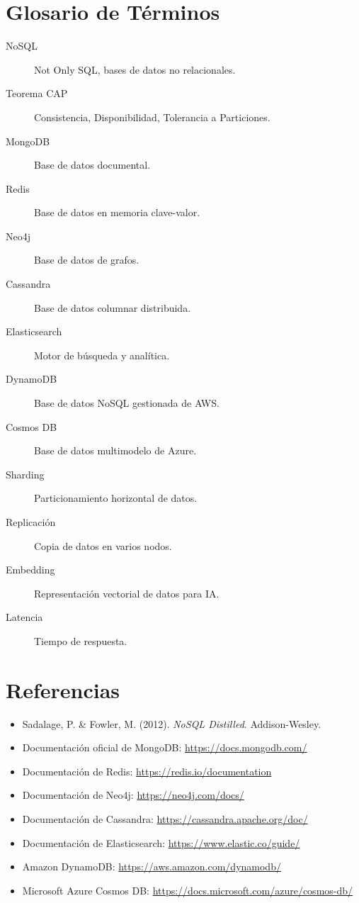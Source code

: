 \documentclass[12pt,a4paper,openany,oneside]{book}
\begin{document}
\chapter{Glosario de Términos}
\begin{description}
    \item[NoSQL] Not Only SQL, bases de datos no relacionales.
    \item[Teorema CAP] Consistencia, Disponibilidad, Tolerancia a Particiones.
    \item[MongoDB] Base de datos documental.
    \item[Redis] Base de datos en memoria clave-valor.
    \item[Neo4j] Base de datos de grafos.
    \item[Cassandra] Base de datos columnar distribuida.
    \item[Elasticsearch] Motor de búsqueda y analítica.
    \item[DynamoDB] Base de datos NoSQL gestionada de AWS.
    \item[Cosmos DB] Base de datos multimodelo de Azure.
    \item[Sharding] Particionamiento horizontal de datos.
    \item[Replicación] Copia de datos en varios nodos.
    \item[Embedding] Representación vectorial de datos para IA.
    \item[Latencia] Tiempo de respuesta.
\end{description}

\chapter*{Referencias}
\begin{itemize}
    \item Sadalage, P. \& Fowler, M. (2012). \textit{NoSQL Distilled}. Addison-Wesley.
    \item Documentación oficial de MongoDB: \url{https://docs.mongodb.com/}
    \item Documentación de Redis: \url{https://redis.io/documentation}
    \item Documentación de Neo4j: \url{https://neo4j.com/docs/}
    \item Documentación de Cassandra: \url{https://cassandra.apache.org/doc/}
    \item Documentación de Elasticsearch: \url{https://www.elastic.co/guide/}
    \item Amazon DynamoDB: \url{https://aws.amazon.com/dynamodb/}
    \item Microsoft Azure Cosmos DB: \url{https://docs.microsoft.com/azure/cosmos-db/}
\end{itemize}
\end{document}
